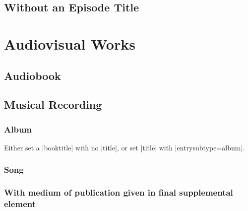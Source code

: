 \documentclass{article}
\begin{document}
\subsection{Without an Episode Title} %
\label{sub:without_an_episode_title}
\begin{refsection}
	\printbibliography[heading=none]
\end{refsection}

\section{Audiovisual Works} %
\label{sec:audiovisual_works}
\subsection{Audiobook} %
\label{sub:audiobook}
\begin{refsection}
	\printbibliography[heading=none]
\end{refsection}
\subsection{Musical Recording} %
\label{sub:musical_recording}
\subsubsection{Album} %
\label{ssub:album}
Either set a |booktitle| with no |title|, or set |title| with  |entrysubtype={album}|.
\begin{refsection}
	\printbibliography[heading=none]
\end{refsection}
\subsubsection{Song} %
\label{ssub:song}
\begin{refsection}
	\printbibliography[heading=none]
\end{refsection}
\subsubsection{With medium of publication given in final supplemental element} %
\label{ssub:with_medium_of_publication_given_in_final_supplemental_element}
\begin{refsection}
	\printbibliography[heading=none]
\end{refsection}
\end{document}
